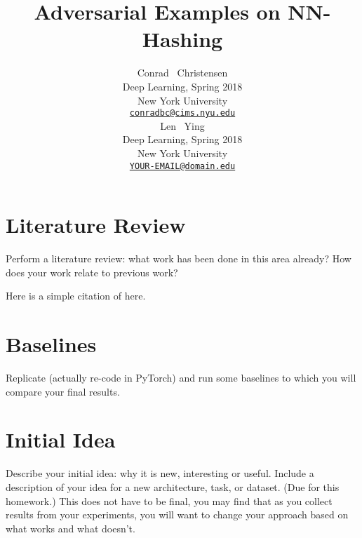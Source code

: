 \documentclass{article}
\title{Adversarial Examples on NN-Hashing}
\author{
  Conrad ~Christensen\\
  Deep Learning, Spring 2018\\
  New York University\\
  \href{mailto:conradbc@cims.nyu.edu}{\texttt{conradbc@cims.nyu.edu}} \\
  \And
  Len ~Ying\\
  Deep Learning, Spring 2018\\
  New York University\\
  \href{mailto:YOUR-EMAIL@domain.edu}{\texttt{YOUR-EMAIL@domain.edu}}
}
\begin{document}

\maketitle

\begin{abstract}

\end{abstract}

\section{Literature Review}

Perform a literature review: what work has been done in this area already? How does
your work relate to previous work? 

Here is a simple citation of \cite{DBLP:journals/corr/SzegedyZSBEGF13} here.

\section{Baselines}

Replicate (actually re-code in PyTorch) and run some baselines to which you will
compare your final results.

\section{Initial Idea}

Describe your initial idea: why it is new, interesting or useful. Include a description
of your idea for a new architecture, task, or dataset. (Due for this homework.)
This does not have to be final, you may find that as you collect results from your
experiments, you will want to change your approach based on what works and what
doesn't.


 
\end{document}
